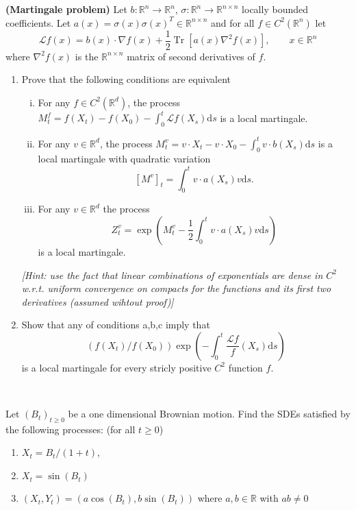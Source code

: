 \documentclass{article}
\newcommand{\mathd}{\mathrm{d}}
\newcommand{\tmop}[1]{\ensuremath{\operatorname{#1}}}
\newcommand{\tmtextbf}[1]{{\bfseries{#1}}}
\newcommand{\tmtextit}[1]{{\itshape{#1}}}
\newenvironment{enumeratealpha}{\begin{enumerate}[a{\textup{)}}] }{\end{enumerate}}
\newenvironment{enumerateroman}{\begin{enumerate}[i.] }{\end{enumerate}}
{\theorembodyfont{\rmfamily\small}\newtheorem{exercise}{Exercise}}
\begin{document}
\begin{exercise}
  [Pts 4+2] \tmtextbf{(Martingale problem)} Let $b : \mathbb{R}^n_{}
  \rightarrow \mathbb{R}^n$, $\sigma : \mathbb{R}^n \rightarrow \mathbb{R}^{n
  \times n}$ locally bounded coefficients. Let $a (x) = \sigma (x) \sigma
  (x)^T \in \mathbb{R}^{n \times n}$ and for all $f \in C^2 (\mathbb{R}^n)$
  let
  \[ \mathcal{L}f (x) = b (x) \cdot \nabla f (x) + \frac{1}{2} \tmop{Tr} [a
     (x) \nabla^2 f (x)], \qquad x \in \mathbb{R}^n \]
  where $\nabla^2 f (x)$ is the $\mathbb{R}^{n \times n}$ matrix of second
  derivatives of $f$.
  \begin{enumeratealpha}
    \item Prove that the following conditions are equivalent
    \begin{enumerateroman}
      \item For any $f \in C^2 (\mathbb{R}^d)$, the process $M^f_t = f (X_t) -
      f (X_0) - \int_0^t \mathcal{L}f (X_s) \mathd s$ is a local martingale.
      
      \item For any $v \in \mathbb{R}^d$, the process $M^v_t = v \cdot X_t - v
      \cdot X_0 - \int_0^t v \cdot b (X_s) \mathd s$ is a local martingale
      with quadratic variation
      \[ [M^v]_t = \int_0^t v \cdot a (X_s) v \mathd s. \]
      \item For any $v \in \mathbb{R}^d$ the process
      \[ Z^v_t = \exp \left( M^v_t - \frac{1}{2} \int_0^t v \cdot a (X_s) v
         \mathd s \right) \]
      is a local martingale. 
    \end{enumerateroman}
    \tmtextit{[Hint: use the fact that linear combinations of exponentials are
    dense in $C^2$ w.r.t. uniform convergence on compacts for the functions
    and its first two derivatives (assumed wihtout proof)]}
    
    \item Show that any of conditions a,b,c imply that
    \[ (f (X_t) / f (X_0)) \exp \left( - \int_0^t \frac{\mathcal{L}f}{f} (X_s)
       \mathd s \right) \]
    is a local martingale for every stricly positive $C^2$ function $f$.
  \end{enumeratealpha}
\end{exercise}

\

\hrulefill

\begin{exercise}
  [Pts 2+2+2] Let $(B_t)_{t \geqslant 0}$ be a one dimensional Brownian
  motion. Find the SDEs satisfied by the following processes: (for all $t
  \geqslant 0$)
  \begin{enumeratealpha}
    \item $X_t = B_t / (1 + t)$,
    
    \item $X_t = \sin (B_t)$
    
    \item $(X_t, Y_t) = (a \cos (B_t), b \sin (B_t))$ where $a, b \in
    \mathbb{R}$ with $a b \neq 0$
  \end{enumeratealpha}
\end{exercise}
\end{document}
